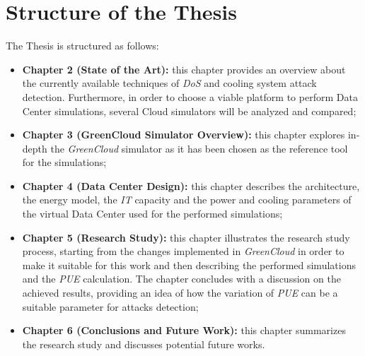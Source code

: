 \section{Structure of the Thesis}
The Thesis is structured as follows:
\begin{itemize}
    \item \textbf{Chapter 2 (State of the Art):} this chapter provides an overview about the currently available techniques of \emph{DoS} and cooling system attack detection. Furthermore, in order to choose a viable platform to perform Data Center simulations, several Cloud simulators will be analyzed and compared;
    \item \textbf{Chapter 3 (GreenCloud Simulator Overview):} this chapter explores in-depth the \emph{GreenCloud} simulator as it has been chosen as the reference tool for the simulations;
    \item \textbf{Chapter 4 (Data Center Design):} this chapter describes the architecture, the energy model, the \emph{IT} capacity and the power and cooling parameters of the virtual Data Center used for the performed simulations;
    \item \textbf{Chapter 5 (Research Study):} this chapter illustrates the research study process, starting from the changes implemented in \emph{GreenCloud} in order to make it suitable for this work and then describing the performed simulations and the \emph{PUE} calculation. The chapter concludes with a discussion on the achieved results, providing an idea of how the variation of \emph{PUE} can be a suitable parameter for attacks detection;
    \item \textbf{Chapter 6 (Conclusions and Future Work):} this chapter summarizes the research study and discusses potential future works.
\end{itemize}